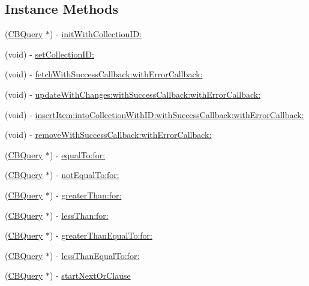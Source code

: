 \subsection*{Instance Methods}
\begin{DoxyCompactItemize}
\item 
(\hyperlink{interface_c_b_query}{C\+B\+Query} $\ast$) -\/ \hyperlink{interface_c_b_query_a945b8a169282151a97e6a0fd694cbb33}{init\+With\+Collection\+I\+D\+:}
\item 
(void) -\/ \hyperlink{interface_c_b_query_aa6df57d4b22629273cb22d39157ab234}{set\+Collection\+I\+D\+:}
\item 
(void) -\/ \hyperlink{interface_c_b_query_a2ff55cfdc8420ce06c3bfe334691a7cd}{fetch\+With\+Success\+Callback\+:with\+Error\+Callback\+:}
\item 
(void) -\/ \hyperlink{interface_c_b_query_abc87df2b71bebfdb3a3d18cc8a864b72}{update\+With\+Changes\+:with\+Success\+Callback\+:with\+Error\+Callback\+:}
\item 
(void) -\/ \hyperlink{interface_c_b_query_ad4969cfce37f0dbd14c825db32946f31}{insert\+Item\+:into\+Collection\+With\+I\+D\+:with\+Success\+Callback\+:with\+Error\+Callback\+:}
\item 
(void) -\/ \hyperlink{interface_c_b_query_aebdcf0fe2e5db5152cc3da1ef077b52f}{remove\+With\+Success\+Callback\+:with\+Error\+Callback\+:}
\item 
(\hyperlink{interface_c_b_query}{C\+B\+Query} $\ast$) -\/ \hyperlink{interface_c_b_query_a3ff649bb71392f2f21e210f07f0ef761}{equal\+To\+:for\+:}
\item 
(\hyperlink{interface_c_b_query}{C\+B\+Query} $\ast$) -\/ \hyperlink{interface_c_b_query_af7920062116379d99531b3443a8c3aa3}{not\+Equal\+To\+:for\+:}
\item 
(\hyperlink{interface_c_b_query}{C\+B\+Query} $\ast$) -\/ \hyperlink{interface_c_b_query_a26d58f8c51997aea862c26cc291d743e}{greater\+Than\+:for\+:}
\item 
(\hyperlink{interface_c_b_query}{C\+B\+Query} $\ast$) -\/ \hyperlink{interface_c_b_query_a29af545dcdf721cae1534c219a991021}{less\+Than\+:for\+:}
\item 
(\hyperlink{interface_c_b_query}{C\+B\+Query} $\ast$) -\/ \hyperlink{interface_c_b_query_a52b23279069fa19429ed6473ecf0eb73}{greater\+Than\+Equal\+To\+:for\+:}
\item 
(\hyperlink{interface_c_b_query}{C\+B\+Query} $\ast$) -\/ \hyperlink{interface_c_b_query_ac8007f263dbc069970ee76c90666b043}{less\+Than\+Equal\+To\+:for\+:}
\item 
(\hyperlink{interface_c_b_query}{C\+B\+Query} $\ast$) -\/ \hyperlink{interface_c_b_query_a6c53b75ca0e6e4f3abe09194676f5a80}{start\+Next\+Or\+Clause}
\end{DoxyCompactItemize}

